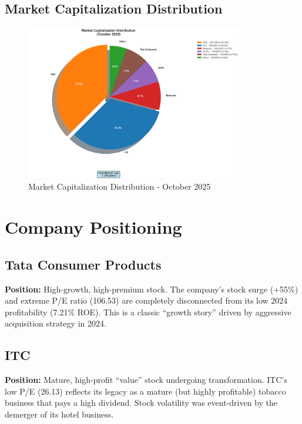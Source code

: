 \documentclass[12pt, a4paper]{report}
\begin{document}
\subsection{Market Capitalization Distribution}

\begin{figure}[H]
    \centering
    \includegraphics[width=0.85\textwidth]{assets/industry_profile /market_cap_chart.png}
    \caption{Market Capitalization Distribution - October 2025}
\end{figure}

\section{Company Positioning}

\subsection{Tata Consumer Products}

\textbf{Position:} High-growth, high-premium stock. The company's stock surge (+55\%) and extreme P/E ratio (106.53) are completely disconnected from its low 2024 profitability (7.21\% ROE). This is a classic ``growth story'' driven by aggressive acquisition strategy in 2024.

\subsection{ITC}

\textbf{Position:} Mature, high-profit ``value'' stock undergoing transformation. ITC's low P/E (26.13) reflects its legacy as a mature (but highly profitable) tobacco business that pays a high dividend. Stock volatility was event-driven by the demerger of its hotel business.
\end{document}
